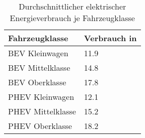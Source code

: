 {
\renewcommand{\arraystretch}{1.2}%
\begin{table}[H]
	\begin{center}
		\caption{Durchschnittlicher elektrischer Energieverbrauch je Fahrzeugklasse}
		\begin{tabu} to 0.7\textwidth {X[1] X[1, r]}
			\hline
			Fahrzeugklasse    & Verbrauch in \si{\kwhkm} \\ \hline
			BEV Kleinwagen    & \num{11.9}              \\
			BEV Mittelklasse  & \num{14.8}              \\
			BEV Oberklasse    & \num{17.8}              \\
			PHEV Kleinwagen   & \num{12.1}              \\
			PHEV Mittelklasse & \num{15.2}              \\
			PHEV Oberklasse   & \num{18.2}              \\ \hline
		\end{tabu}
		\label{tab:TechVerbrauch}
	\end{center}
	\vspace{-3mm}%
\end{table}
}